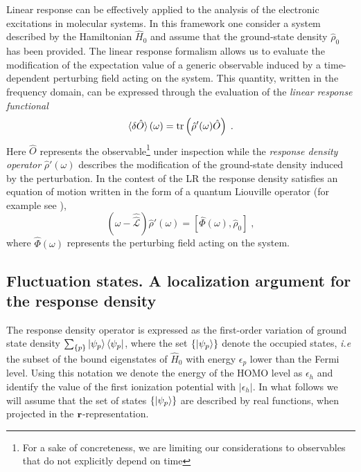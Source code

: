 \documentclass[reprint,aps,prb]{revtex4-1}
\renewcommand{\r}{{\bf r}}
\newcommand{\eps}{\epsilon}
\newcommand{\be}{\begin{equation}}
\newcommand{\ee}{\end{equation}}
\newcommand{\lb}{\label}
\newcommand{\op}[1]{\hat {#1}}
\newcommand{\sop}[1]{\op{\op {#1}}}
\newcommand{\commutator}[2]{\left[ {#1} , {#2} \right]}
\newcommand{\trace}[1]{\mathrm{tr}\left(#1\right)}
\newcommand{\dmnot}{\op{\rho}_0}
\newcommand{\dm}{\op{\rho}}
\newcommand{\hnot}{\op{H}_0}
\newcommand{\Liouv}{\sop{\mathcal L}}
\begin{document}
Linear response can be effectively applied to the analysis of the electronic excitations in molecular systems. In this framework one consider a system described by the Hamiltonian 
$\hnot$ and assume that the ground-state density $\dmnot$ has been provided. The linear response formalism allows us to evaluate the modification of the expectation value of a generic 
observable induced by a time-dependent perturbing field acting on the system. This quantity, written in the frequency domain, can be expressed through the evaluation of the 
\emph{linear response functional}
\be\lb{LinearResponseFunctDef1}
\braket{\delta\op O}(\omega) = \trace{\dm'(\omega)\op O} \;.
\ee
Here $\op O$ represents the observable\footnote{For a sake of concreteness, we are limiting our considerations to observables that do not explicitly depend on time} under inspection 
while the \emph{response density operator} $\dm'(\omega)$ describes the modification of the ground-state density induced by the perturbation. In the contest of the LR the response 
density satisfies an equation of motion written in the form of a quantum Liouville operator (for example see \cite{baroni2008}),
\be\lb{LiouvillianRhopomegaDef1}
\left(\omega - \Liouv\right) \dm'(\omega) =  \commutator{\op\Phi(\omega)}{\dmnot} \;,
\ee
where $\op\Phi(\omega)$ represents the perturbing field acting on the system. 

\subsection{Fluctuation states. A localization argument for the response density}
\label{FluctuationState}

The response density operator is expressed as the first-order variation of ground state density $\sum_{\{p\}} \ket{\psi_p} \bra{\psi_p}$, where the set $\{\ket{\psi_p}\}$ denote the 
occupied states, \emph{i.e} the subset of the bound eigenstates of $\hnot$ with energy $\eps_p$ lower than the Fermi level. Using this notation we denote the energy of the HOMO level 
as $\eps_h$ and identify the value of the first ionization potential with $|\eps_h|$. In what follows we will assume that the set of states $\{\ket{\psi_p}\}$ are described by real 
functions, when projected in the $\r$-representation.  
\end{document}
